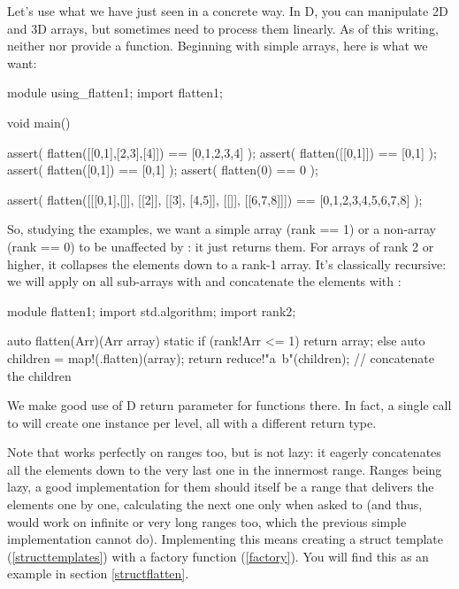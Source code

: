 Let's use what we have just seen in a concrete way. In D, you can manipulate 2D and 3D arrays, but sometimes need to process them linearly. As of this writing, neither  nor  provide a  function. Beginning with simple arrays, here is what we want:

\begin{dcode}
module using_flatten1;
import flatten1;

void main()
{
    assert( flatten([[0,1],[2,3],[4]]) == [0,1,2,3,4] );
    assert( flatten([[0,1]]) == [0,1] );
    assert( flatten([0,1]) == [0,1] );
    assert( flatten(0) == 0 );

    assert( flatten([[[0,1],[]], [[2]], [[3], [4,5]], [[]], [[6,7,8]]])
            == [0,1,2,3,4,5,6,7,8] );
}
\end{dcode}

So, studying the examples, we want a simple array (rank == 1) or a non-array (rank == 0) to be unaffected by : it just returns them. For arrays of rank 2 or higher, it collapses the elements down to a rank-1 array. It's classically recursive: we will apply  on all sub-arrays with  and concatenate the elements with :

\begin{dcode}
module flatten1;
import std.algorithm;
import rank2;

auto flatten(Arr)(Arr array)
{
    static if (rank!Arr <= 1)
        return array;
    else
    {
        auto children = map!(.flatten)(array);
        return reduce!"a~b"(children); // concatenate the children
    }
}
\end{dcode}

We make good use of D  return parameter for functions there. In fact, a single call to  will create one instance per level, all with a different return type. 

Note that  works perfectly on ranges too, but is not lazy: it eagerly concatenates all the elements down to the very last one in the innermost range. Ranges being lazy, a good  implementation for them should itself be a range that delivers the elements one by one, calculating the next one only when asked to (and thus, would work on infinite or very long ranges too, which the previous simple implementation cannot do). Implementing this means creating a struct template (\ref{structtemplates}) with a factory function (\ref{factory}). You will find this as an example in section \ref{structflatten}.

